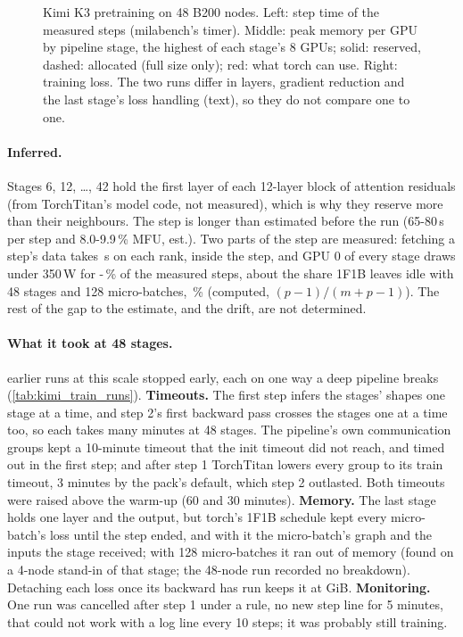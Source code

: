 \begin{figure}[h]
  \centering{}
  \caption{Kimi K3 pretraining on 48 B200 nodes. Left: step time of the measured steps (milabench's timer). Middle: peak memory per GPU by pipeline stage, the highest of each stage's 8 GPUs; solid: reserved, dashed: allocated (full size only); red: what torch can use. Right: training loss. The two runs differ in layers, gradient reduction and the last stage's loss handling (text), so they do not compare one to one.}
  \label{fig:kimi_training}
\end{figure}

\paragraph{Inferred.} Stages 6, 12, \dots, 42 hold the first layer of each 12-layer block of attention residuals (from TorchTitan's model code, not measured), which is why they reserve more than their neighbours. The step is longer than estimated before the run (65-80\,s per step and 8.0-9.9\,\% MFU, est.). Two parts of the step are measured: fetching a step's data takes \TriKtFetch\,s on each rank, inside the step, and GPU 0 of every stage draws under 350\,W for \TriKtLowLo-\TriKtLowHi\,\% of the measured steps, about the share 1F1B leaves idle with 48 stages and 128 micro-batches, \TriKtBubblePct\,\% (computed, $(p-1)/(m+p-1)$). The rest of the gap to the estimate, and the drift, are not determined.

\paragraph{What it took at 48 stages.} \TriKtFailed{} earlier runs at this scale stopped early, each on one way a deep pipeline breaks (\cref{tab:kimi_train_runs}). \textbf{Timeouts.} The first step infers the stages' shapes one stage at a time, and step 2's first backward pass crosses the stages one at a time too, so each takes many minutes at 48 stages. The pipeline's own communication groups kept a 10-minute timeout that the init timeout did not reach, and timed out in the first step; and after step 1 TorchTitan lowers every group to its train timeout, 3 minutes by the pack's default, which step 2 outlasted. Both timeouts were raised above the warm-up (60 and 30 minutes). \textbf{Memory.} The last stage holds one layer and the output, but torch's 1F1B schedule kept every micro-batch's loss until the step ended, and with it the micro-batch's graph and the inputs the stage received; with 128 micro-batches it ran out of memory (found on a 4-node stand-in of that stage; the 48-node run recorded no breakdown). Detaching each loss once its backward has run keeps it at \TriKtMemLast{} GiB. \textbf{Monitoring.} One run was cancelled after step 1 under a rule, no new step line for 5 minutes, that could not work with a log line every 10 steps; it was probably still training.


